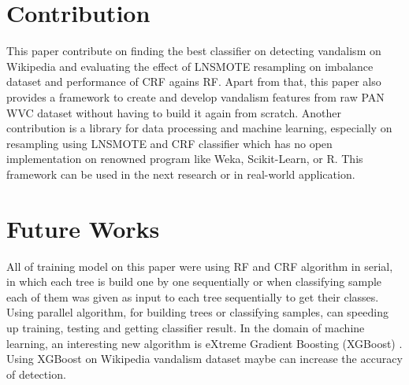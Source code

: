 \section{Contribution}

This paper contribute on finding the best classifier on detecting vandalism on
Wikipedia and evaluating the effect of LNSMOTE resampling on imbalance dataset
and performance of CRF agains RF.
Apart from that, this paper also provides a framework to create and develop
vandalism features from raw PAN WVC dataset without having to build it again
from scratch.
Another contribution is a library for data processing and machine learning,
especially on resampling using LNSMOTE and CRF classifier which has no
open implementation on renowned program like Weka, Scikit-Learn, or R.
This framework can be used in the next research or in real-world application.

\section{Future Works}

All of training model on this paper were using RF and CRF algorithm in serial,
in which each tree is build one by one sequentially or when classifying sample
each of them was given as input to each tree sequentially to get their classes.
Using parallel algorithm, for building trees or classifying samples, can
speeding up training, testing and getting classifier result.
In the domain of machine learning, an interesting new algorithm is eXtreme
Gradient Boosting (XGBoost) \cite{chen2016xgboost}.
Using XGBoost on Wikipedia vandalism dataset maybe can increase the accuracy
of detection.





